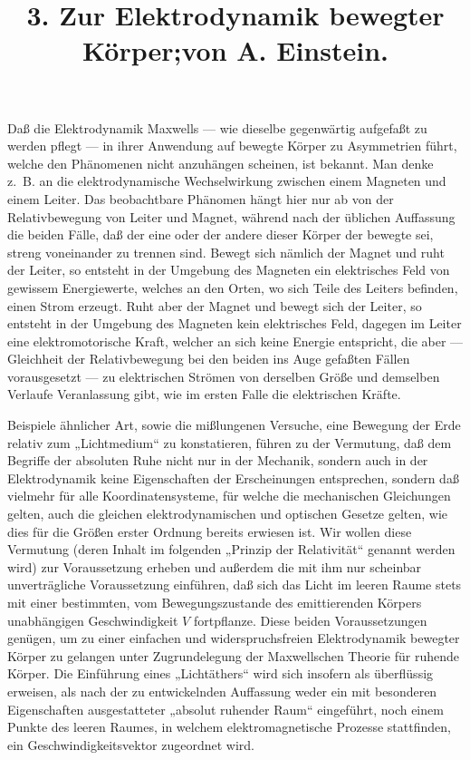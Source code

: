 \documentclass[17pt]{webarticle}       %
\title{3. Zur Elektrodynamik bewegter Körper;\newline von A. Einstein.}
\date{ }    %
\author{ }
\begin{document}

\maketitle

Daß die Elektrodynamik Maxwells — wie dieselbe gegenwärtig aufgefaßt zu werden pflegt — in ihrer Anwendung auf bewegte Körper zu Asymmetrien führt, welche den Phänomenen nicht anzuhängen scheinen, ist bekannt. Man denke z.~B. an die elektrodynamische Wechselwirkung zwischen einem Magneten und einem Leiter. Das beobachtbare Phänomen hängt hier nur ab von der Relativbewegung von Leiter und Magnet, während nach der üblichen Auffassung die beiden Fälle, daß der eine oder der andere dieser Körper der bewegte sei, streng voneinander zu trennen sind. Bewegt sich nämlich der Magnet und ruht der Leiter, so entsteht in der Umgebung des Magneten ein elektrisches Feld von gewissem Energiewerte, welches an den Orten, wo sich Teile des Leiters befinden, einen Strom erzeugt. Ruht aber der Magnet und bewegt sich der Leiter, so entsteht in der Umgebung des Magneten kein elektrisches Feld, dagegen im Leiter eine elektromotorische Kraft, welcher an sich keine Energie entspricht, die aber — Gleichheit der Relativbewegung bei den beiden ins Auge gefaßten Fällen vorausgesetzt — zu elektrischen Strömen von derselben Größe und demselben Verlaufe Veranlassung gibt, wie im ersten Falle die elektrischen Kräfte.

Beispiele ähnlicher Art, sowie die mißlungenen Versuche, eine Bewegung der Erde relativ zum „Lichtmedium“ zu konstatieren, führen zu der Vermutung, daß dem Begriffe der absoluten Ruhe nicht nur in der Mechanik, sondern auch in der Elektrodynamik keine Eigenschaften der Erscheinungen entsprechen, sondern daß vielmehr für alle Koordinatensysteme, für welche die mechanischen Gleichungen gelten, auch die gleichen elektrodynamischen und optischen Gesetze gelten, wie dies für die Größen erster Ordnung bereits erwiesen ist. Wir wollen diese Vermutung (deren Inhalt im folgenden „Prinzip der Relativität“ genannt werden wird) zur Voraussetzung erheben und außerdem die mit ihm nur scheinbar unverträgliche Voraussetzung einführen, daß sich das Licht im leeren Raume stets mit einer bestimmten, vom Bewegungszustande des emittierenden Körpers unabhängigen Geschwindigkeit \( V \) fortpflanze. Diese beiden Voraussetzungen genügen, um zu einer einfachen und widerspruchsfreien Elektrodynamik bewegter Körper zu gelangen unter Zugrundelegung der Maxwellschen Theorie für ruhende Körper. Die Einführung eines „Lichtäthers“ wird sich insofern als überflüssig erweisen, als nach der zu entwickelnden Auffassung weder ein mit besonderen Eigenschaften ausgestatteter „absolut ruhender Raum“ eingeführt, noch einem Punkte des leeren Raumes, in welchem elektromagnetische Prozesse stattfinden, ein Geschwindigkeitsvektor zugeordnet wird.
\end{document}
